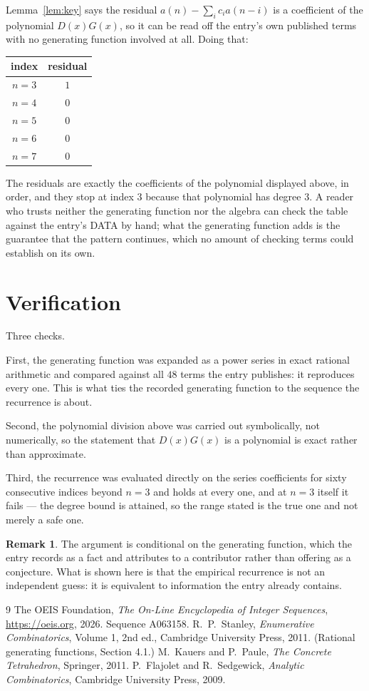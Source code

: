 \documentclass[11pt,a4paper]{article}
\theoremstyle{plain}
\theoremstyle{definition}
\newtheorem{remark}[theorem]{Remark}
\begin{document}
Lemma~\ref{lem:key} says the residual $a(n)-\sum_ic_ia(n-i)$ is a coefficient of the
polynomial $D(x)G(x)$, so it can be read off the entry's own published terms with no
generating function involved at all. Doing that:
\begin{center}
\begin{tabular}{cc}
index & residual \\ \hline
$n=3$ & $1$ \\
$n=4$ & $0$ \\
$n=5$ & $0$ \\
$n=6$ & $0$ \\
$n=7$ & $0$
\end{tabular}
\end{center}
The residuals are exactly the coefficients of the polynomial displayed above, in order, and
they stop at index $3$ because that polynomial has degree $3$. A reader who trusts
neither the generating function nor the algebra can check the table against the entry's DATA
by hand; what the generating function adds is the guarantee that the pattern continues, which
no amount of checking terms could establish on its own.

\section{Verification}

Three checks.

First, the generating function was expanded as a power series in exact rational arithmetic and
compared against all $48$ terms the entry publishes: it reproduces every one. This is
what ties the recorded generating function to the sequence the recurrence is about.

Second, the polynomial division above was carried out symbolically, not numerically, so the
statement that $D(x)G(x)$ is a polynomial is exact rather than approximate.

Third, the recurrence was evaluated directly on the series coefficients for sixty consecutive
indices beyond $n=3$ and holds at every one, and at $n=3$ itself it fails --- the
degree bound is attained, so the range stated is the true one and not merely a safe one.

\begin{remark}
The argument is conditional on the generating function, which the entry records as a fact and
attributes to a contributor rather than offering as a conjecture. What is shown here is that
the empirical recurrence is not an independent guess: it is equivalent to information the
entry already contains.
\end{remark}

\begin{thebibliography}{9}
 The OEIS Foundation, \emph{The On-Line Encyclopedia of Integer
Sequences}, \url{https://oeis.org}, 2026. Sequence A063158.
 R.~P.~Stanley, \emph{Enumerative Combinatorics}, Volume 1, 2nd ed.,
Cambridge University Press, 2011. (Rational generating functions, Section 4.1.)
 M.~Kauers and P.~Paule, \emph{The Concrete Tetrahedron}, Springer, 2011.
 P.~Flajolet and R.~Sedgewick, \emph{Analytic Combinatorics}, Cambridge
University Press, 2009.
\end{thebibliography}
\end{document}
